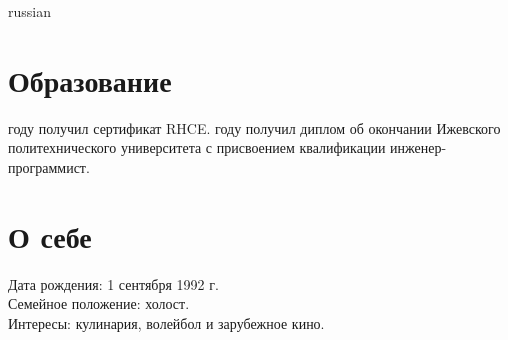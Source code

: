 \documentclass[margin, 10pt]{res}
\begin{document}
\begin{otherlanguage*}{russian}
\begin{resume}
\section{Образование}

\setlength\parindent{12pt}

 году получил сертификат RHCE.
\setlength{\parskip}{0.5em}
 году получил диплом об окончании Ижевского политехнического
университета с присвоением квалификации инженер-программист.

\setlength\parindent{0pt}


\section{О себе}

Дата рождения: 1 сентября 1992 г.\\
Семейное положение: холост.\\
Интересы: кулинария, волейбол и зарубежное кино.\\

\end{resume}
\end{otherlanguage*}
\end{document}
